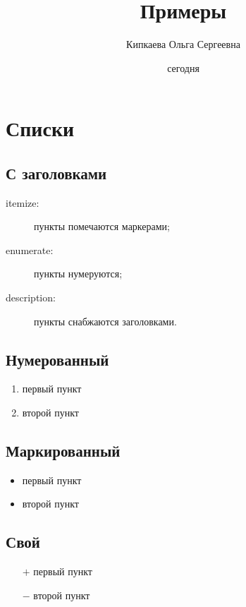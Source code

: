 \documentclass[12pt]{article}
\begin{document}

\begin{titlepage}
\title{Примеры}
\author{Кипкаева Ольга Сергеевна}
\date{сегодня}
\maketitle %
\thispagestyle{empty}
\end{titlepage}

\tableofcontents
\newpage

\section{Списки}
\subsection*{С заголовками} %
\begin{description}
\item[itemize:] пункты помечаются маркерами;
\item[enumerate:] пункты нумеруются;
\item[description:] пункты снабжаются заголовками.
\end{description}

\subsection{Нумерованный}
\begin{enumerate}
\item первый пункт
\item второй пункт
\end{enumerate}

\subsection{Маркированный}
\begin{itemize}
\item первый пункт
\item второй пункт
\end{itemize}

\subsection{Свой}
\begin{itemize}
\item[$+$] первый пункт
\item[$-$] второй пункт
\end{itemize}
\end{document}
